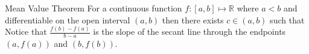 \begin{proposition}{Mean Value Theorem}
  For a continuous function $f: \left[ a,b \right] \mapsto \mathbb{R} $ where $a < b$ and differentiable on the open interval $ \left( a, b \right)$ then there exists $c \in \left( a, b \right)$ such that 
  Notice that  $ \frac{f\left(b\right)  -  f\left(a\right)}{b  -  a}$ is the slope of the secant line through the endpoints $ \left(  a, f\left(a\right) \right)$ and $ \left( b, f\left(b\right) \right)$.
\end{proposition}
